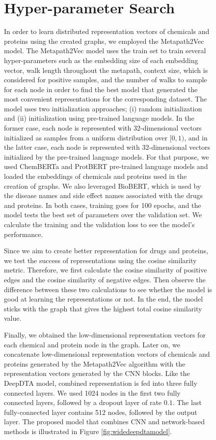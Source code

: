 \begin{figure}[h]
\section{Hyper-parameter Search}
In order to learn distributed representation vectors of chemicals and proteins using the created graphs, we employed the Metapath2Vec model. The Metapath2Vec model uses the train set to train several hyper-parameters such as the embedding size of each embedding vector, walk length throughout the metapath, context size, which is considered for positive samples, and the number of walks to sample for each node in order to find the best model that generated the most convenient representations for the corresponding dataset. The model uses two initialization approaches; (i) random initialization and (ii) initialization using pre-trained language models. In the former case, each node is represented with 32-dimensional vectors initialized as samples from a uniform distribution over $[0,1)$, and in the latter case, each node is represented with 32-dimensional vectors initialized by the pre-trained language models. For that purpose, we used ChemBERTa and ProtBERT pre-trained language models and loaded the embeddings of chemicals and proteins used in the creation of graphs. We also leveraged BioBERT, which is used by the disease names and side effect names associated with the drugs and proteins. In both cases, training goes for 100 epochs, and the model tests the best set of parameters over the validation set. We calculate the training and the validation loss to see the model's performance. 

Since we aim to create better representation for drugs and proteins, we test the success of representations using the cosine similarity metric. Therefore, we first calculate the cosine similarity of positive edges and the cosine similarity of negative edges. Then observe the difference between these two calculations to see whether the model is good at learning the representations or not. In the end, the model sticks with the graph that gives the highest total cosine similarity value. 

Finally, we obtained the low-dimensional representation vectors for each chemical and protein node in the graph. Later on, we concatenate low-dimensional representation vectors of chemicals and proteins generated by the Metapath2Vec algorithm with the representation vectors generated by the CNN blocks. Like the DeepDTA model, combined representation is fed into three fully connected layers. We used 1024 nodes in the first two fully connected layers, followed by a dropout layer of rate $0.1$. The last fully-connected layer contains 512 nodes, followed by the output layer. The proposed model that combines CNN and network-based methods is illustrated in Figure \ref{fig:widedeepdtamodel}.


\end{figure}
